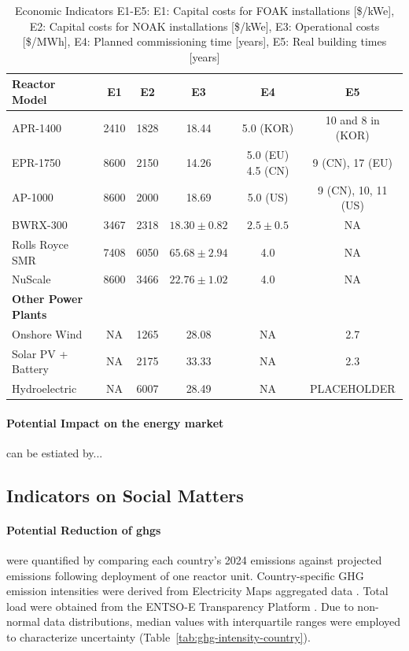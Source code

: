 \begin{table}[!hb]
    \centering
    \begin{tabularx}{\textwidth}{X c c c c c}
        \toprule
        \textbf{Reactor Model} & \textbf{E1} & \textbf{E2} & \textbf{E3} & \textbf{E4} & \textbf{E5} \\
        \midrule
        APR-1400         & 2410 & 1828 & 18.44 & 5.0 (KOR) & 10 and 8 in (KOR) \\
        EPR-1750        & 8600 & 2150 & 14.26 & 5.0 (EU) 4.5 (CN) & 9 (CN), 17 (EU) \\
        AP-1000          & 8600 & 2000 & 18.69 & 5.0 (US) & 9 (CN), 10, 11 (US) \\
        BWRX-300        & 3467 & 2318 & $18.30 \pm 0.82$ & $2.5 \pm 0.5$ & NA \\
        Rolls Royce SMR & 7408 & 6050 & $65.68 \pm 2.94$ & 4.0 & NA \\
        NuScale         & 8600 & 3466 & $22.76 \pm 1.02$ & 4.0 & NA \\
        \textbf{Other Power Plants} & & & & & \\
        Onshore Wind   & NA & 1265 & 28.08 & NA & 2.7 \\
        Solar PV + Battery & NA & 2175 & 33.33 & NA & 2.3 \\
        Hydroelectric  & NA & 6007 & 28.49 & NA & PLACEHOLDER \\
        \bottomrule
    \end{tabularx}
    \caption{Economic Indicators E1-E5: E1: Capital costs for FOAK installations [\$/kWe], E2: Capital costs for NOAK installations [\$/kWe], E3: Operational costs [\$/MWh], E4: Planned commissioning time [years], E5: Real building times [years]}
    \label{tab:consolidated-costs-building-time}
\end{table}


\paragraph{Potential Impact on the energy market} can be estiated by...

\subsection{Indicators on Social Matters}
\paragraph{Potential Reduction of \glspl{ghg}} were quantified by comparing each country's 2024 emissions against projected emissions following deployment of one reactor unit. Country-specific GHG emission intensities were derived from Electricity Maps aggregated data \cite{ElectricityMaps_CarbonIntensity_2024}. Total load were obtained from the ENTSO-E Transparency Platform \cite{ENTSOE_Transparency_2025}. Due to non-normal data distributions, median values with interquartile ranges were employed to characterize uncertainty (Table~\ref{tab:ghg-intensity-country}). \\

